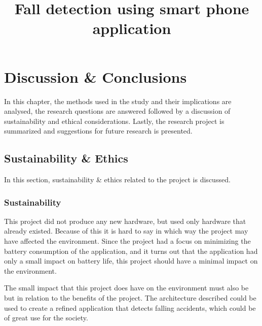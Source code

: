 \documentclass[12pt, a4paper, onecolumn]{article}
\begin{document}
	
	\title{Fall detection using smart phone application}
	\maketitle
	
	\tableofcontents
	\newpage
	
	\section{Discussion \& Conclusions}
	
	In this chapter, the methods used in the study and their implications are analysed, the research questions are answered followed by a discussion of sustainability and ethical considerations. Lastly, the research project is summarized and suggestions for future research is presented.
	
	\subsection{Sustainability \& Ethics}
	
	In this section, sustainability \& ethics related to the project is discussed.
	
	\subsubsection{Sustainability}
	
	This project did not produce any new hardware, but used only hardware that already existed. Because of this it is hard to say in which way the project may have affected the environment. Since the project had a focus on minimizing the battery consumption of the application, and it turns out that the application had only a small impact on battery life, this project should have a minimal impact on the environment.
	
	The small impact that this project does have on the environment must also be but in relation to the benefits of the project. The architecture described could be used to create a refined application that detects falling accidents, which could be of great use for the society. 
	
	
	
	
	
	
\end{document}
